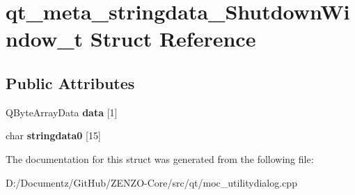 \hypertarget{structqt__meta__stringdata___shutdown_window__t}{}\section{qt\+\_\+meta\+\_\+stringdata\+\_\+\+Shutdown\+Window\+\_\+t Struct Reference}
\label{structqt__meta__stringdata___shutdown_window__t}
\subsection*{Public Attributes}
\begin{DoxyCompactItemize}
\item 
\mbox{\label{structqt__meta__stringdata___shutdown_window__t_aadee8c057d52292297df28c561b4cce1}} 
Q\+Byte\+Array\+Data {\bfseries data} \mbox{[}1\mbox{]}
\item 
\mbox{\label{structqt__meta__stringdata___shutdown_window__t_ae3ab7f5a4fbb0cc91f09585cd6d7b40e}} 
char {\bfseries stringdata0} \mbox{[}15\mbox{]}
\end{DoxyCompactItemize}


The documentation for this struct was generated from the following file\+:\begin{DoxyCompactItemize}
\item 
D\+:/\+Documentz/\+Git\+Hub/\+Z\+E\+N\+Z\+O-\/\+Core/src/qt/moc\+\_\+utilitydialog.\+cpp\end{DoxyCompactItemize}
